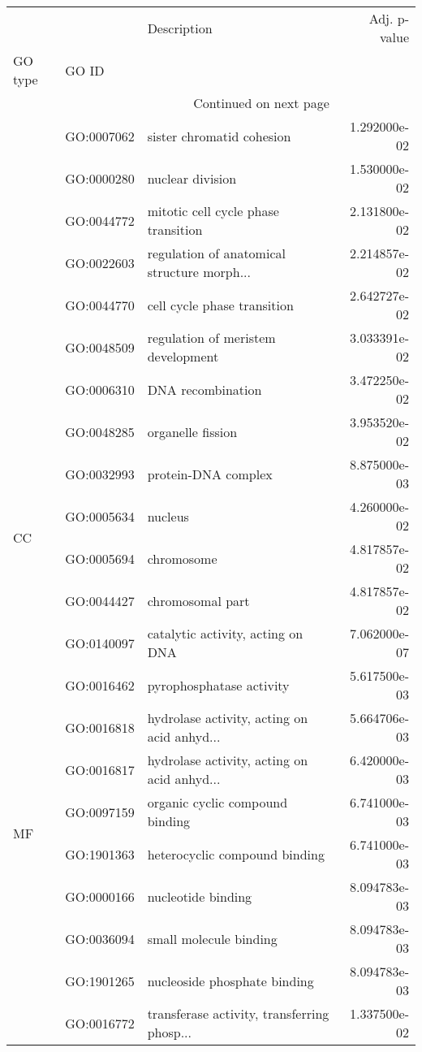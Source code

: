 \begin{longtable}{lllr}
\toprule
   &            &                                  Description &  Adj. p-value \\
GO type & GO ID &                                              &               \\
\midrule
\endhead
\midrule
\multicolumn{3}{r}{{Continued on next page}} \\
\midrule
\endfoot

\bottomrule
\endlastfoot
\multirow{8}{*}{BP} & GO:0007062 &                    sister chromatid cohesion &  1.292000e-02 \\
   & GO:0000280 &                             nuclear division &  1.530000e-02 \\
   & GO:0044772 &          mitotic cell cycle phase transition &  2.131800e-02 \\
   & GO:0022603 &  regulation of anatomical structure morph... &  2.214857e-02 \\
   & GO:0044770 &                  cell cycle phase transition &  2.642727e-02 \\
   & GO:0048509 &           regulation of meristem development &  3.033391e-02 \\
   & GO:0006310 &                            DNA recombination &  3.472250e-02 \\
   & GO:0048285 &                            organelle fission &  3.953520e-02 \\
\cline{1-4}
\multirow{4}{*}{CC} & GO:0032993 &                          protein-DNA complex &  8.875000e-03 \\
   & GO:0005634 &                                      nucleus &  4.260000e-02 \\
   & GO:0005694 &                                   chromosome &  4.817857e-02 \\
   & GO:0044427 &                             chromosomal part &  4.817857e-02 \\
\cline{1-4}
\multirow{10}{*}{MF} & GO:0140097 &            catalytic activity, acting on DNA &  7.062000e-07 \\
   & GO:0016462 &                     pyrophosphatase activity &  5.617500e-03 \\
   & GO:0016818 &  hydrolase activity, acting on acid anhyd... &  5.664706e-03 \\
   & GO:0016817 &  hydrolase activity, acting on acid anhyd... &  6.420000e-03 \\
   & GO:0097159 &              organic cyclic compound binding &  6.741000e-03 \\
   & GO:1901363 &                heterocyclic compound binding &  6.741000e-03 \\
   & GO:0000166 &                           nucleotide binding &  8.094783e-03 \\
   & GO:0036094 &                       small molecule binding &  8.094783e-03 \\
   & GO:1901265 &                 nucleoside phosphate binding &  8.094783e-03 \\
   & GO:0016772 &  transferase activity, transferring phosp... &  1.337500e-02 \\
\end{longtable}
